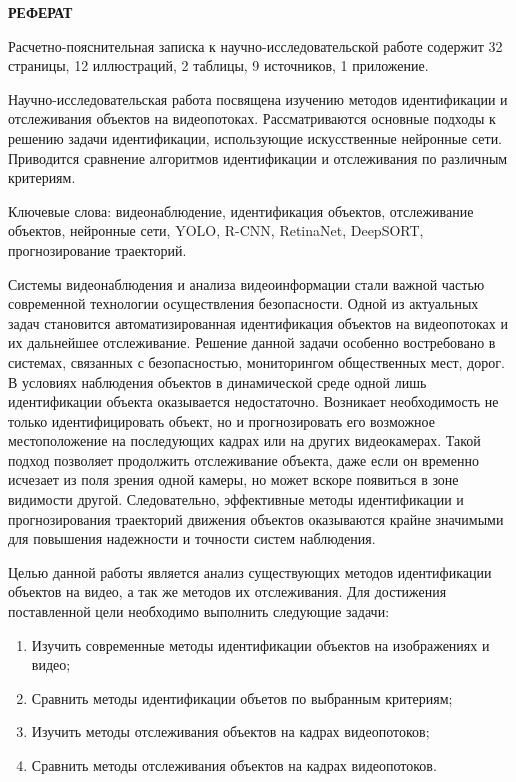 


%
\begin{center}
    \textbf{РЕФЕРАТ}
\end{center}
\setcounter{page}{3}

Расчетно-пояснительная записка к научно-исследовательской работе содержит 32 страницы, 12 иллюстраций, 2 таблицы, 9 источников, 1 приложение.

Научно-исследовательская работа посвящена изучению методов идентификации и отслеживания объектов на видеопотоках. Рассматриваются основные подходы к решению задачи идентификации, использующие искусственные нейронные сети. Приводится сравнение алгоритмов идентификации и отслеживания по различным критериям.

Ключевые слова: видеонаблюдение, идентификация объектов, отслеживание объектов, нейронные сети, YOLO, R-CNN, RetinaNet, DeepSORT, прогнозирование траекторий.

\nocite{*}
\makeatletter
\renewcommand{\l@section}{\@dottedtocline{1}{0em}{2em}} %
\renewcommand{\l@subsection}{\@dottedtocline{2}{1em}{2.5em}} %
\makeatother
\renewcommand{\contentsname}{\hfill СОДЕРЖАНИЕ \hfill}
\tableofcontents
\renewcommand{\labelenumi}{\theenumi)}



Системы видеонаблюдения и анализа видеоинформации стали важной частью современной технологии осуществления безопасности. Одной из актуальных задач становится автоматизированная идентификация объектов на видеопотоках и их дальнейшее отслеживание. Решение данной задачи особенно востребовано  в системах, связанных с безопасностью, мониторингом общественных мест, дорог. В условиях наблюдения объектов в динамической среде одной лишь идентификации объекта оказывается недостаточно. Возникает необходимость не только идентифицировать объект, но и прогнозировать его возможное местоположение на последующих кадрах или на других видеокамерах. Такой подход позволяет продолжить отслеживание объекта, даже если он временно исчезает из поля зрения одной камеры, но может вскоре появиться в зоне видимости другой. Следовательно, эффективные методы идентификации и прогнозирования траекторий движения объектов оказываются крайне значимыми для повышения надежности и точности систем наблюдения.

Целью данной работы является анализ существующих методов идентификации объектов на видео, а так же методов их отслеживания. Для достижения поставленной цели необходимо выполнить следующие задачи:
\begin{enumerate}
    \item Изучить современные методы идентификации объектов на изображениях и видео;
    \item Сравнить методы идентификации объетов по выбранным критериям;
    \item Изучить методы отслеживания объектов на кадрах видеопотоков;
    \item Сравнить методы отслеживания объектов на кадрах видеопотоков.
\end{enumerate}

